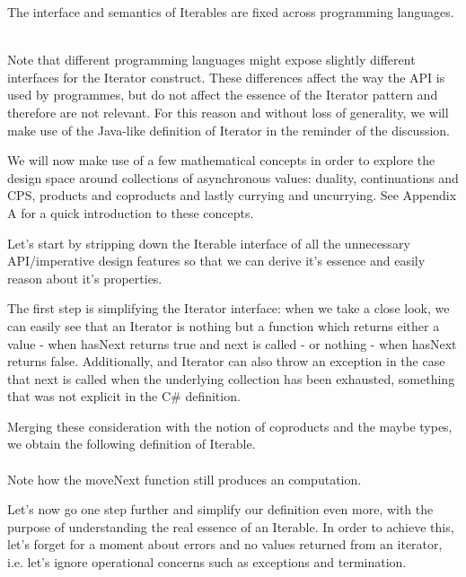 The interface and semantics of Iterables are fixed across programming languages.\\


\\

Note that different programming languages might expose slightly different interfaces for the Iterator construct. These differences  affect the way the API is used by programmes, but do not affect the essence of the Iterator pattern and therefore are not relevant. For this reason and without loss of generality, we will make use of the Java-like definition of Iterator in the reminder of the discussion.

We will now make use of a few mathematical concepts in order to explore the design space around collections of asynchronous values: duality, continuations and CPS, products and coproducts and lastly currying and uncurrying. See Appendix A for a quick introduction to these concepts.

Let's start by stripping down the Iterable interface of all the unnecessary API/imperative design features so that we can derive it's essence and easily reason about it's properties.	

The first step is simplifying the Iterator interface: when we take a close look, we can easily see that an Iterator is nothing but a function which returns either a value - when hasNext returns true and next is called - or nothing - when hasNext returns false. Additionally, and Iterator can also throw an exception in the case that next is called when the underlying collection has been exhausted, something that was not explicit in the C\# definition.

Merging these consideration with the notion of coproducts and the maybe types, we obtain the following definition of Iterable.\\

\\

Note how the moveNext function still produces an  computation.

Let's now go one step further and simplify our definition even more, with the purpose of understanding the real essence of an Iterable. In order to achieve this, let's forget for a moment about errors and no values returned from an iterator, i.e. let's ignore operational concerns such as exceptions and termination.\\

